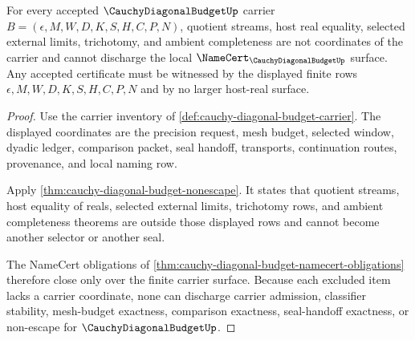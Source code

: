 \begin{theorem}
\label{thm:cauchy-diagonal-budget-nonescape-scope}
For every accepted $\CauchyDiagonalBudgetUp$ carrier $B=(\epsilon,M,W,D,K,S,H,C,P,N)$, quotient streams, host real equality, selected external limits, trichotomy, and ambient completeness are not coordinates of the carrier and cannot discharge the local $\NameCert_{\CauchyDiagonalBudgetUp}$ surface. Any accepted certificate must be witnessed by the displayed finite rows $\epsilon,M,W,D,K,S,H,C,P,N$ and by no larger host-real surface.
\end{theorem}
\begin{proof}
Use the carrier inventory of \autoref{def:cauchy-diagonal-budget-carrier}. The displayed coordinates are the precision request, mesh budget, selected window, dyadic ledger, comparison packet, seal handoff, transports, continuation routes, provenance, and local naming row.

Apply \autoref{thm:cauchy-diagonal-budget-nonescape}. It states that quotient streams, host equality of reals, selected external limits, trichotomy rows, and ambient completeness theorems are outside those displayed rows and cannot become another selector or another seal.

The NameCert obligations of \autoref{thm:cauchy-diagonal-budget-namecert-obligations} therefore close only over the finite carrier surface. Because each excluded item lacks a carrier coordinate, none can discharge carrier admission, classifier stability, mesh-budget exactness, comparison exactness, seal-handoff exactness, or non-escape for $\CauchyDiagonalBudgetUp$.
\end{proof}

